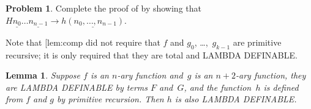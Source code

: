\documentclass[10pt,a4paper]{article}
\makeatletter
\newcommand*{\olup}[1]{\MakeUppercase{#1}}
\theoremstyle{plain}
\newtheorem{lem}[thm]{Lemma}
\theoremstyle{definition}
\newtheorem{prob}{Problem}[section]
\theoremstyle{remark}
\newcommand*{\ollabel}[1]{\label{#1}}
\newcommand{\olref}{\@ifnextchar[{\olref@i}{\olref@final}}
\def\olref@i[#1]{\@ifnextchar[{\olref@ii}{\olref@final}}
\def\olref@ii[#1]{\@ifnextchar[{\olref@iii}{\olref@final}}
\def\olref@iii[#1]{\olref@final}
\def\olref@final#1{\ref{#1}}
\providecommand{\num}[1]{\underline{#1}}
\providecommand{\red}{\mathrel{\rightarrow}}
\makeatother
\begin{document}
\begin{prob}
  Complete the proof of \olref[lam][ldf][prf]{lem:comp} by showing
  that $H\num{n_0}\dots\num{n_{n-1}} \red \num{h(n_0, \dots,
    n_{n-1})}$.
\end{prob}

Note that \olref{lem:comp} did not require that $f$ and $g_0$,
\dots,~$g_{k-1}$ are primitive recursive; it is only required that
they are total and \olup{lambda definable}.

\begin{lem}\ollabel{lem:prim}
  Suppose $f$ is an $n$-ary function and~$g$ is an $n+2$-ary function,
  they are \olup{lambda definable} by terms $F$ and~$G$, and the
  function~$h$ is defined from $f$ and $g$ by primitive
  recursion. Then $h$ is also \olup{lambda definable}.
\end{lem}
\end{document}
